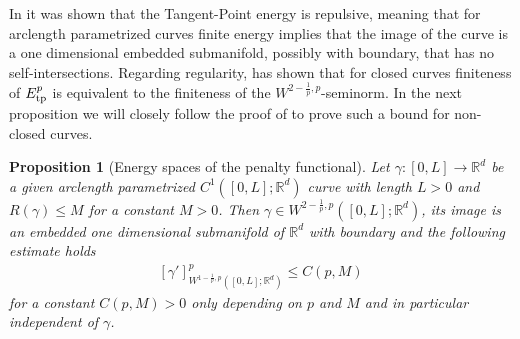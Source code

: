 \documentclass{article}
\def\R{{\mathbb R}}
\newtheorem{proposition}[theorem]{Proposition}
\begin{document}
In \cite[Theorem 1.1]{STRZELECKI_2012} it was shown that the Tangent-Point energy is repulsive, meaning that for arclength parametrized curves finite energy implies that the image of the curve is a one dimensional embedded submanifold, possibly with boundary, that has no self-intersections. 
Regarding regularity, \cite{Blatt2013} has shown that for closed curves finiteness of $E^p_{\rm tp}$ is equivalent to the finiteness of the $W^{2-\frac{1}{p},p}$-seminorm. In the next proposition we will closely follow the proof of \cite[Proposition 2.5]{blatt_regularity_2012} to prove such a bound for non-closed curves.


\begin{proposition}[Energy spaces of the penalty functional]\label{EnergySpaces}
    Let $\gamma:[0,L]\to\R^d$ be a given arclength parametrized $C^{1}([0,L];\R^d)$ curve with length $L>0$ and $R(\gamma) \leq M$ for a constant $M>0$.
    Then $\gamma\in W^{2-\frac{1}{p},p}([0,L];\R^d)$, its image is an embedded one dimensional submanifold of $\R^d$ with boundary and the following estimate holds 
    \begin{align}\label{eq:estimate}
        [\gamma']^p_{W^{1 - \frac{1}{p}, p}([0,L];\R^d)} \leq C(p,M)
    \end{align}
    for a constant $C(p,M) > 0$ only depending on $p$ and $M$ and in particular independent of $\gamma$.
\end{proposition}
\end{document}
